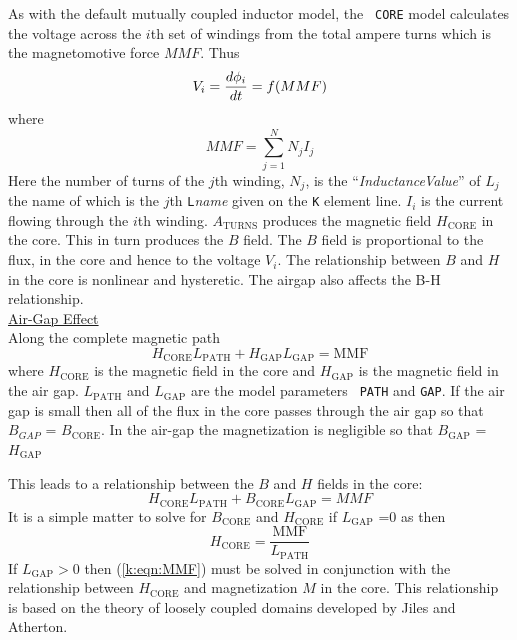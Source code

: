 \documentclass{article}
\begin{document}
As with the default mutually coupled inductor model, the {\tt
CORE} model calculates the voltage across the $i$th set of
windings from the total ampere turns which is the magnetomotive
force $MMF$. Thus
\begin{equation}
V_i = {{\textstyle d \phi_i } \over {\textstyle d t}} = f( MMF )
\end{equation}
where
\begin{equation}
MMF = \sum_{j=1}^N N_j I_j
\end{equation}
Here the number of turns of the $j$th winding, $N_j$, is the
``{\it InductanceValue}'' of $L_j$ the name of which is the $j$th
{\tt L}{\it name} given on the {\tt K} element line. $I_i$ is the
current flowing through the $i$th winding. $A_{\mathrm{TURNS}}$
produces the magnetic field $H_{\mathrm{CORE}}$ in the core. This in
turn produces the $B$ field. The $B$ field is proportional to the
flux, in the core and hence to the voltage $V_i$. The relationship
between $B$ and $H$ in the core is nonlinear
and hysteretic. The airgap also affects the B-H relationship.\\[0.1in]
\noindent\underline{Air-Gap Effect}\\[0.1in]
Along the complete magnetic path
\begin{equation}
H_{\mathrm{CORE}} L_{\mathrm{PATH}} + H_{\mathrm{GAP}} L_{\mathrm{GAP}} = \mathrm{MMF}
\end{equation}
where $H_{\mathrm{CORE}}$ is the magnetic field in the core and
$H_{\mathrm{GAP}}$ is the magnetic field in the air gap.
$L_{\mathrm{PATH}}$ and $L_{\mathrm{GAP}}$ are the model parameters {\tt
PATH} and {\tt GAP}. If the air gap is small then  all of the flux
in the core passes through the air gap so that $B_{GAP}$ =
$B_{\mathrm{CORE}}$. In the air-gap the magnetization is negligible so
that $B_{\mathrm{GAP}}$ = $H_{\mathrm{GAP}}$

This leads to a relationship between the $B$ and $H$ fields in the
core:
\begin{equation}
H_{\mathrm{CORE}} L_{\mathrm{PATH}} + B_{\mathrm{CORE}} L_{\mathrm{GAP}} = MMF
\label{k:eqn:MMF}
\end{equation}
It is a simple matter to solve for $B_{\mathrm{CORE}}$ and
$H_{\mathrm{CORE}}$ if $L_{\mathrm{GAP}}$ =0 as then
\begin{equation}
H_{\mathrm{CORE}} = \frac{\mathrm{MMF}}{L_{\mathrm{PATH}}}
\end{equation}
If $L_{\mathrm{GAP}} > 0$ then (\ref{k:eqn:MMF}) must be solved in
conjunction with the relationship between $H_{\mathrm{CORE}}$ and
magnetization $M$ in the core. This relationship is based on the
theory of loosely coupled domains developed by Jiles and Atherton.
\end{document}
